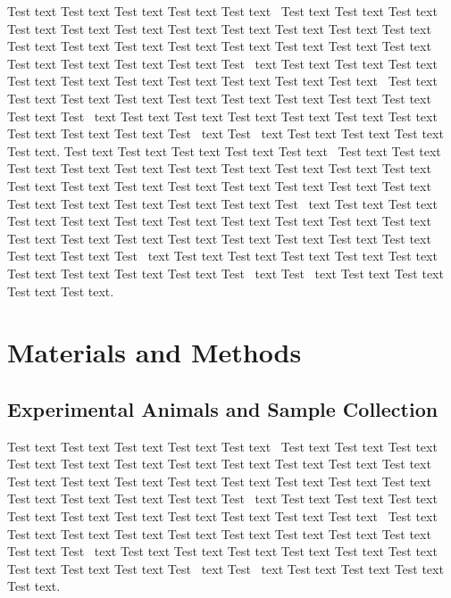 \documentclass[animals,article,accept,moreauthors,pdftex]{Definitions/mdpi}
\begin{document}
Test text Test text Test text Test text Test text~\cite{B1-animals-4264543} Test text Test text Test text Test text Test text Test text Test text Test text Test text Test text Test text Test text Test text Test text Test text Test text Test text Test text Test text Test text Test text Test text Test text Test~\cite{B2-animals-4264543} text Test text Test text Test text Test text Test text Test text Test text Test text Test text Test text~\cite{B3-animals-4264543} Test text Test text Test text Test text Test text Test text Test text Test text Test text Test text Test~\cite{B4-animals-4264543} text Test text Test text Test text Test text Test text Test text Test text Test text Test text Test~\cite{B5-animals-4264543} text Test~\cite{B6-animals-4264543} text Test text Test text Test text Test text.
Test text Test text Test text Test text Test text~\cite{B1-animals-4264543} Test text Test text Test text Test text Test text Test text Test text Test text Test text Test text Test text Test text Test text Test text Test text Test text Test text Test text Test text Test text Test text Test text Test text Test~\cite{B2-animals-4264543} text Test text Test text Test text Test text Test text Test text Test text Test text Test text Test text~\cite{B3-animals-4264543} Test text Test text Test text Test text Test text Test text Test text Test text Test text Test text Test~\cite{B4-animals-4264543} text Test text Test text Test text Test text Test text Test text Test text Test text Test text Test~\cite{B5-animals-4264543} text Test~\cite{B6-animals-4264543} text Test text Test text Test text Test text.


\section{Materials and Methods \label{sect:sec2-animals-4264543}}

\subsection{Experimental Animals and Sample Collection \label{sect:sec2dot1-animals-4264543}}

Test text Test text Test text Test text Test text~\cite{B1-animals-4264543} Test text Test text Test text Test text Test text Test text Test text Test text Test text Test text Test text Test text Test text Test text Test text Test text Test text Test text Test text Test text Test text Test text Test text Test~\cite{B2-animals-4264543} text Test text Test text Test text Test text Test text Test text Test text Test text Test text Test text~\cite{B3-animals-4264543} Test text Test text Test text Test text Test text Test text Test text Test text Test text Test text Test~\cite{B4-animals-4264543} text Test text Test text Test text Test text Test text Test text Test text Test text Test text Test~\cite{B5-animals-4264543} text Test~\cite{B6-animals-4264543} text Test text Test text Test text Test text.
\end{document}
